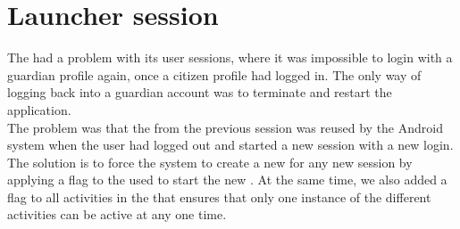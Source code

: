 
\section{Launcher session}
\label{sec:launcher_session_issues}

The \launcher had a problem with its user sessions, where it was impossible to login with a guardian profile again, once a citizen profile had logged in. The only way of logging back into a guardian account was to terminate and restart the application. \\

The problem was that the  from the previous session was reused by the Android system when the user had logged out and started a new session with a new login.\\

The solution is to force the system to create a new  for any new session by applying a flag to the  used to start the new . At the same time, we also added a flag to all activities in the \launcher that ensures that only one instance of the different activities can be active at any one time.
